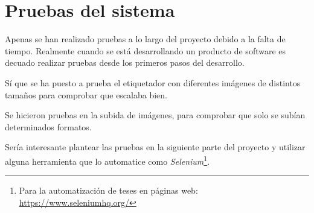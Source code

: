 \section{Pruebas del sistema}
Apenas se han realizado pruebas a lo largo del proyecto debido a la falta de tiempo. Realmente cuando se está desarrollando un producto de software es decuado realizar pruebas desde los primeros pasos del desarrollo.

Sí que se ha puesto a prueba el etiquetador con diferentes imágenes de distintos tamaños para comprobar que escalaba bien.

Se hicieron pruebas en la subida de imágenes, para comprobar que solo se subían determinados formatos.

Sería interesante plantear las pruebas en la siguiente parte del proyecto y utilizar alguna herramienta que lo automatice como \textit{Selenium}\footnote{Para la automatización de teses en páginas web: \url{https://www.seleniumhq.org/}}.